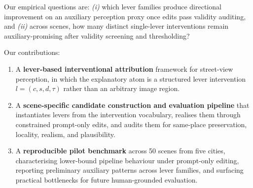 Our empirical questions are: \emph{(i)} which lever families produce
directional improvement on an auxiliary perception proxy once edits pass
validity auditing, and \emph{(ii)} across scenes, how many distinct
single-lever interventions remain auxiliary-promising after validity
screening and thresholding?

Our contributions:
\begin{enumerate}
    \item A \textbf{lever-based interventional attribution} framework
    for street-view perception, in which the explanatory atom is a
    structured lever intervention $l=(c,s,d,\tau)$ rather than an
    arbitrary image region.

    \item A \textbf{scene-specific candidate construction and evaluation
    pipeline} that instantiates levers from the intervention
    vocabulary, realises them through constrained prompt-only edits, and
    audits them for same-place preservation, locality, realism, and
    plausibility.

    \item A \textbf{reproducible pilot benchmark} across 50 scenes from five cities, characterising lower-bound pipeline behaviour under prompt-only editing, reporting preliminary auxiliary patterns across lever families, and surfacing practical bottlenecks for future human-grounded evaluation.
\end{enumerate}